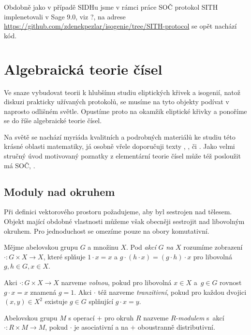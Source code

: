 \documentclass[12pt]{report}
\begin{document}
Obdobně jako v případě SIDHu jsme v rámci práce SOČ protokol SITH implenetovali v Sage 9.0, viz ?, na adrese \url{https://github.com/zdenekpezlar/isogenie/tree/SITH-protocol} se opět nachází kód.


\chapter{Algebraická teorie čísel}

Ve snaze vybudovat teorii k hlubšímu studiu eliptických křivek a isogenií, natož diskuzi prakticky užívaných protokolů, se musíme na tyto objekty podívat v naprosto odlišném světle. Opustíme proto na okamžik eliptické křivky a ponoříme se do říše algebraické teorie čísel.

Na světě se nachází myriáda kvalitních a podrobných materiálů ke studiu této krásné oblasti matematiky, já osobně vřele doporučuji texty \cite[Ch. XIII]{Chen}, \cite{Ireland}, \cite{Neukirch} či \cite{Pupik}. Jako velmi stručný úvod motivovaný poznatky z elementární teorie čísel může též posloužit má SOČ, \cite{Pezlar}. 

\section{Moduly nad okruhem}

Při definici vektorového prostoru požadujeme, aby byl sestrojen nad tělesem. Objekt mající obdobné vlastnosti můžeme však obecněji sestrojit nad libovolným okruhem. Pro jednoduchost se omezíme pouze na obory komutativní.

\begin{definice}
Mějme abelovskou grupu $G$ a množinu $X$. Pod \textit{akcí} $G$ \textit{na} $X$ rozumíme zobrazení $\cdot : G \times X \longrightarrow X$, které splňuje $1 \cdot x = x$ a $g \cdot (h \cdot x) = (g \cdot h) \cdot x$ pro libovolná $g,h \in G, x \in X$.
\end{definice}
\begin{definice}
Akci $\cdot : G \times X \longrightarrow X$ nazveme \textit{volnou}, pokud pro libovolná $x \in X$ a~$g \in G$ rovnost $g \cdot x = x$ znamená $g = 1$. Akci $\cdot$ též nazveme \textit{tranzitivní}, pokud pro každou dvojici $(x,y) \in X^2$ existuje $g \in G$ splňující $g \cdot x = y$.
\end{definice}

\begin{definice}
Abelovskou grupu $M$ s operací $+$ pro okruh $R$ nazveme $R$-\textit{modulem} s~akcí $\cdot : R \times M \longrightarrow M$, pokud $\cdot$ je asociativní a na $+$ oboustranně distributivní.
\end{definice}
\end{document}
